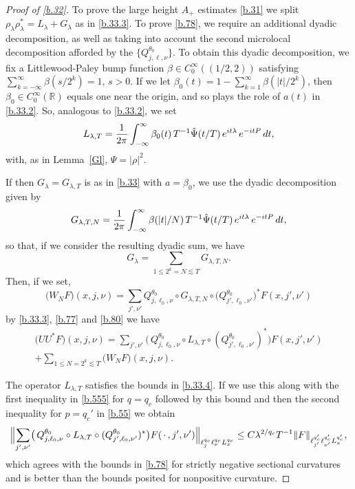 \documentclass[10pt]{amsart}
\newcommand{\la}{\lambda}
\newcommand{\1}{{\bf 1}}
\newcommand{\R}{{\mathbb R}}
\begin{document}
\begin{proof}[Proof of \eqref{b.32}]
To prove the large height $A_+$ estimates \eqref{b.31} we split $\rho_\la\rho_\la^*=L_\la+G_\la$ as in 
\eqref{b.33.3}.  To prove \eqref{b.78}, we require an additional dyadic decomposition, as well as taking into account
the second microlocal decomposition afforded by the $\{Q^{\theta_0}_{j,\ell,\nu}\}$.  To obtain this dyadic decomposition, we
fix a Littlewood-Paley bump function $\beta\in C^\infty_0((1/2,2))$ satisfying $\sum_{k=-\infty}^\infty \beta(s/2^k)=1$,
$s>0$.  If we let $\beta_0(t)=1-\sum_{k=1}^\infty \beta(|t|/2^k)$, then $\beta_0\in C^\infty_0(\R)$ equals one near the 
origin, and so plays the role of $a(t)$ in \eqref{b.33.2}.  So, analogous to \eqref{b.33.2}, we set
$$L_{\la,T}=\frac1{2\pi}\int_{-\infty}^\infty \beta_0(t)
\, T^{-1}\Hat \Psi(t/T) \, e^{it\la} \, e^{-itP} \, dt,
$$
with, as in Lemma~\ref{Gl}, $\Psi =|\rho|^2$.


If then $G_\la=G_{\la,T}$ is as in \eqref{b.33} with $a=\beta_0$, we use the dyadic decomposition given by
\begin{equation}\label{b.79}
G_{\la,T,N}=\frac1{2\pi} \int_{-\infty}^\infty \beta(|t|/N) \, T^{-1}\Hat \Psi (t/T) \, e^{it\la} \, e^{-itP} \, dt,
\end{equation}
so that, if we consider the resulting dyadic sum, we have
\begin{equation}\label{b.80}
G_\la =\sum_{1\le 2^k=N\lesssim T} G_{\la,T,N}.
\end{equation} 
Then, if we set,
\begin{equation}\label{b.81}
\bigl(W_N F\bigr)(x, j ,\nu)=\sum_{j',\nu'} Q^{\theta_0}_{j,\ell_0,\nu}
\circ G_{\la,T,N} \circ
\bigl(Q^{\theta_0}_{j',\ell_0,\nu'}\bigr)^* F(x,j',\nu')
\end{equation}
by \eqref{b.33.3}, \eqref{b.77} and \eqref{b.80} we have
\begin{multline}\label{b.82}
\bigl(U U^*F)(x,j,\nu)=\sum_{j',\nu'}
\bigl( \, Q^{\theta_0}_{j,\ell_0,\nu}\circ L_{\la,T}\circ (Q^{\theta_0}_{j',\ell_0,\nu'})^*\bigr)F(x ,j',\nu')
\\
+\sum_{1\le N=2^k\lesssim T}\bigl(W_NF\bigr)(x, j, \nu).
\end{multline}


The operator $L_{\la,T}$ satisfies the bounds in \eqref{b.33.4}.  If we use this along with the first inequality
in \eqref{b.555} for $q=q_c$ followed by this bound and then the second inequality for $p=q_c'$ in 
\eqref{b.55} we obtain
$$
\Bigl\|
\sum_{j',\nu'}
\bigl( \, Q^{\theta_0}_{j,\ell_0,\nu}\circ L_{\la,T}\circ (Q^{\theta_0}_{j',\ell_0,\nu'})^*\bigr)F(\, \cdot\, ,j',\nu')
\Bigr\|_{\ell^{q_c}_j\ell^{q_c}_\nu L^{q_c}_x} \le C\la^{2/q_c}T^{-1}
\|F\|_{\ell^{q_c'}_{j'}\ell^{q_c'}_{\nu'}L^{q_c'}_x},
$$
which agrees with the bounds in \eqref{b.78} for strictly negative sectional curvatures and is better than the bounds
posited for nonpositive curvature.



\end{proof}
\end{document}
